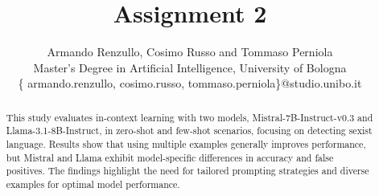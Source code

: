 \documentclass[11pt]{article}
\begin{document}
%
\title{Assignment 2\\
\large {}
}
\author{Armando Renzullo, Cosimo Russo and Tommaso Perniola\\
Master's Degree in Artificial Intelligence, University of Bologna\\
\{ armando.renzullo, cosimo.russo, tommaso.perniola\}@studio.unibo.it
}
\maketitle


\begin{abstract} This study evaluates in-context learning with two models, Mistral-7B-Instruct-v0.3 and Llama-3.1-8B-Instruct, in zero-shot and few-shot scenarios, focusing on detecting sexist language. Results show that using multiple examples generally improves performance, but Mistral and Llama exhibit model-specific differences in accuracy and false positives. The findings highlight the need for tailored prompting strategies and diverse examples for optimal model performance.


\end{abstract}
\end{document}
